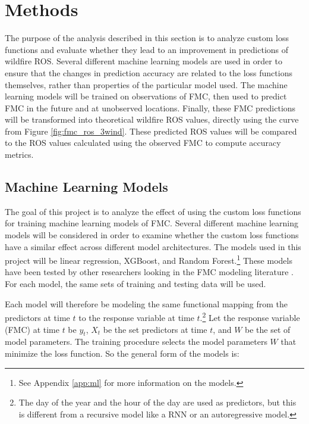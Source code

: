 \documentclass[11pt]{article}%
\begin{document}
\section{Methods}

The purpose of the analysis described in this section is to analyze custom loss functions and evaluate whether they lead to an improvement in predictions of wildfire ROS. Several different machine learning models are used in order to ensure that the changes in prediction accuracy are related to the loss functions themselves, rather than properties of the particular model used. The machine learning models will be trained on observations of FMC, then used to predict FMC in the future and at unobserved locations. Finally, these FMC predictions will be transformed into theoretical wildfire ROS values, directly using the curve from Figure \ref{fig:fmc_ros_3wind}. These predicted ROS values will be compared to the ROS values calculated using the observed FMC to compute accuracy metrics.

\subsection{Machine Learning Models}
\label{sec:ml}

The goal of this project is to analyze the effect of using the custom loss functions for training machine learning models of FMC. Several different machine learning models will be considered in order to examine whether the custom loss functions have a similar effect across different model architectures. The models used in this project will be linear regression, XGBoost, and Random Forest.\footnote{See Appendix \ref{app:ml} for more information on the models.} These models have been tested by other researchers looking in the FMC modeling literature \citep{Lee-2020-EFM,McCandless-2020-EWS, Schreck-2023-MLV}. For each model, the same sets of training and testing data will be used. 

Each model will therefore be modeling the same functional mapping from the predictors at time $t$ to the response variable at time $t$.\footnote{The day of the year and the hour of the day are used as predictors, but this is different from a recursive model like a RNN or an autoregressive model.} Let the response variable (FMC) at time $t$ be $y_t$, $X_t$ be the set predictors at time $t$, and $W$ be the set of model parameters. The training procedure selects the model parameters $W$ that minimize the loss function. So the general form of the models is:
\end{document}
